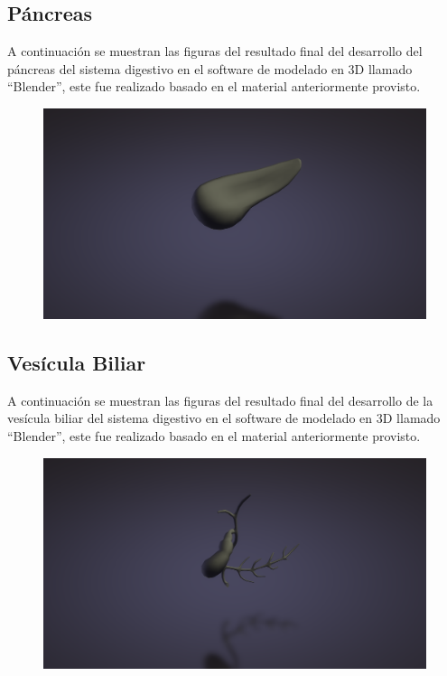 \subsection{Páncreas}
A continuación se muestran las figuras del resultado final del desarrollo del páncreas del sistema digestivo en el software de modelado en 3D llamado “Blender”, este fue realizado basado en el material anteriormente provisto.\\
\begin{figure}[H]
	\begin{center}
 		\includegraphics[width = .5\textwidth]{source/images/image19.png}
	\end{center} 
\end{figure}

\subsection{Vesícula Biliar}
A continuación se muestran las figuras del resultado final del desarrollo de la vesícula biliar del sistema digestivo en el software de modelado en 3D llamado “Blender”, este fue realizado basado en el material anteriormente provisto.\\
\begin{figure}[H]
	\begin{center}
 		\includegraphics[width = .5\textwidth]{source/images/image26.png}
	\end{center} 
\end{figure}

